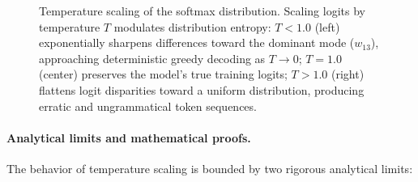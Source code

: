 \documentclass[../../main.tex]{subfiles}
\begin{document}
\begin{figure}[htbp]
{\begin{tikzpicture}
\end{tikzpicture}%
}
\caption{Temperature scaling of the softmax distribution. Scaling logits by temperature $T$ modulates distribution entropy: $T < 1.0$ (left) exponentially sharpens differences toward the dominant mode ($w_{13}$), approaching deterministic greedy decoding as $T \to 0$; $T = 1.0$ (center) preserves the model's true training logits; $T > 1.0$ (right) flattens logit disparities toward a uniform distribution, producing erratic and ungrammatical token sequences.}
\label{fig:temperature_sampling}
\end{figure}

\paragraph{Analytical limits and mathematical proofs.}
The behavior of temperature scaling is bounded by two rigorous analytical limits:
\end{document}
